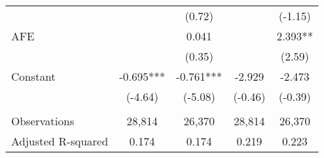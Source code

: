 \begin{table}[H]
\begin{center}
\begin{tabular}{lcccc}
			&   & (0.72) &   & (-1.15) \\
			AFE &   & 0.041 &   & 2.393** \\
			&   & (0.35) &   & (2.59) \\
			Constant & -0.695*** & -0.761*** & -2.929 & -2.473 \\
			& (-4.64) & (-5.08) & (-0.46) & (-0.39) \\
			&   &   &   &  \\
			Observations & 28,814 & 26,370 & 28,814 & 26,370 \\
			Adjusted R-squared & 0.174 & 0.174 & 0.219 & 0.223 \\
			\bottomrule
			\bottomrule
		\end{tabular}%
	\end{center}
\end{table}%